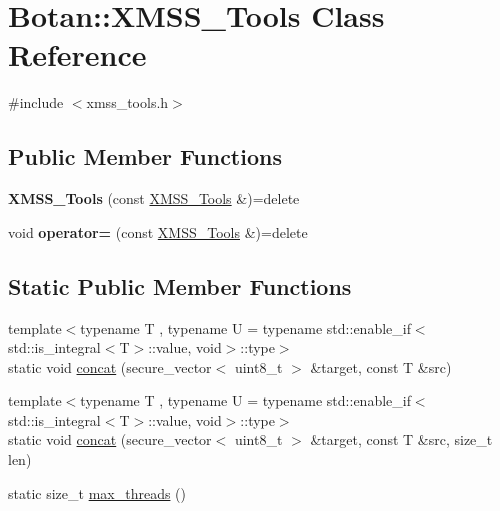 \hypertarget{class_botan_1_1_x_m_s_s___tools}{}\section{Botan\+:\+:X\+M\+S\+S\+\_\+\+Tools Class Reference}
\label{class_botan_1_1_x_m_s_s___tools}


{\ttfamily \#include $<$xmss\+\_\+tools.\+h$>$}

\subsection*{Public Member Functions}
\begin{DoxyCompactItemize}
\item 
\mbox{\label{class_botan_1_1_x_m_s_s___tools_ad48168531c1602a79e7779e3b420b5e9}} 
{\bfseries X\+M\+S\+S\+\_\+\+Tools} (const \mbox{\hyperlink{class_botan_1_1_x_m_s_s___tools}{X\+M\+S\+S\+\_\+\+Tools}} \&)=delete
\item 
\mbox{\label{class_botan_1_1_x_m_s_s___tools_ac9672d0abf8d26d329aec9e0e8c056c0}} 
void {\bfseries operator=} (const \mbox{\hyperlink{class_botan_1_1_x_m_s_s___tools}{X\+M\+S\+S\+\_\+\+Tools}} \&)=delete
\end{DoxyCompactItemize}
\subsection*{Static Public Member Functions}
\begin{DoxyCompactItemize}
\item 
{\footnotesize template$<$typename T , typename U  = typename std\+::enable\+\_\+if$<$std\+::is\+\_\+integral$<$\+T$>$\+::value,                     void$>$\+::type$>$ }\\static void \mbox{\hyperlink{class_botan_1_1_x_m_s_s___tools_add86e0bedfc6b9995c4d04dbe1ac8a2d}{concat}} (secure\+\_\+vector$<$ uint8\+\_\+t $>$ \&target, const T \&src)
\item 
{\footnotesize template$<$typename T , typename U  = typename std\+::enable\+\_\+if$<$std\+::is\+\_\+integral$<$\+T$>$\+::value,                void$>$\+::type$>$ }\\static void \mbox{\hyperlink{class_botan_1_1_x_m_s_s___tools_abe515ea4b81739fc09a6ca36c0487917}{concat}} (secure\+\_\+vector$<$ uint8\+\_\+t $>$ \&target, const T \&src, size\+\_\+t len)
\item 
static size\+\_\+t \mbox{\hyperlink{class_botan_1_1_x_m_s_s___tools_a38f92ca676cd550451c79f6e3271cf63}{max\+\_\+threads}} ()
\end{DoxyCompactItemize}


